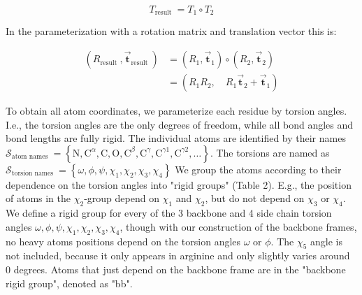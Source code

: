\documentclass[10pt]{article}
\begin{document}
$$
T_{\text {result }}=T_{1} \circ T_{2}
$$

In the parameterization with a rotation matrix and translation vector this is:

$$
\begin{aligned}
\left(R_{\text {result }}, \overrightarrow{\mathbf{t}}_{\text {result }}\right) & =\left(R_{1}, \overrightarrow{\mathbf{t}}_{1}\right) \circ\left(R_{2}, \overrightarrow{\mathbf{t}}_{2}\right) \\
& =\left(R_{1} R_{2}, \quad R_{1} \overrightarrow{\mathbf{t}}_{2}+\overrightarrow{\mathbf{t}}_{1}\right)
\end{aligned}
$$

To obtain all atom coordinates, we parameterize each residue by torsion angles. I.e., the torsion angles are the only degrees of freedom, while all bond angles and bond lengths are fully rigid. The individual atoms are identified by their names $\mathcal{S}_{\text {atom names }}=\left\{\mathrm{N}, \mathrm{C}^{\alpha}, \mathrm{C}, \mathrm{O}, \mathrm{C}^{\beta}, \mathrm{C}^{\gamma}, \mathrm{C}^{\gamma 1}, \mathrm{C}^{\gamma 2}, \ldots\right\}$. The torsions are named as $\mathcal{S}_{\text {torsion names }}=\left\{\omega, \phi, \psi, \chi_{1}, \chi_{2}, \chi_{3}, \chi_{4}\right\}$ We group the atoms according to their dependence on the torsion angles into "rigid groups" (Table 2). E.g., the position of atoms in the $\chi_{2}$-group depend on $\chi_{1}$ and $\chi_{2}$, but do not depend on $\chi_{3}$ or $\chi_{4}$. We define a rigid group for every of the 3 backbone and 4 side chain torsion angles $\omega, \phi, \psi, \chi_{1}, \chi_{2}, \chi_{3}, \chi_{4}$, though with our construction of the backbone frames, no heavy atoms positions depend on the torsion angles $\omega$ or $\phi$. The $\chi_{5}$ angle is not included, because it only appears in arginine and only slightly varies around 0 degrees. Atoms that just depend on the backbone frame are in the "backbone rigid group", denoted as "bb".
\end{document}
